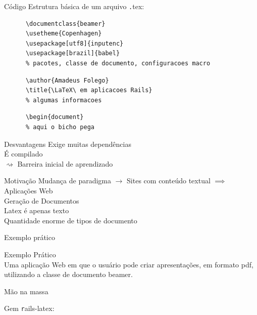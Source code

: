 \documentclass{beamer}
\begin{document}
  \begin{frame}[fragile]{Código}
    Estrutura básica de um arquivo {\texttt .tex}:
    \begin{verbatim}
      \documentclass{beamer}
      \usetheme{Copenhagen}
      \usepackage[utf8]{inputenc}
      \usepackage[brazil]{babel}
      % pacotes, classe de documento, configuracoes macro
    \end{verbatim}
    \pause\begin{verbatim}
      \author{Amadeus Folego}
      \title{\LaTeX\ em aplicacoes Rails}
      % algumas informacoes
    \end{verbatim}
    \pause\begin{verbatim}
      \begin{document}
      % aqui o bicho pega
    \end{verbatim}
\end{frame}
  \begin{frame}{Desvantagens}
     Exige muitas dependências\\\pause
    \onslide<2->{ $ \rightsquigarrow $ } É compilado\\\pause
     Barreira inicial de aprendizado
  \end{frame}
  \begin{frame}{Motivação} 
     Mudança de paradigma $\rightarrow$ {\tiny Sites com conteúdo textual $ \implies $ Aplicações Web}\\\pause
    \onslide<2>{$ \nabla $} Geração de Documentos\\\pause
     Latex é apenas texto\\\pause
     Quantidade enorme de tipos de documento\\
  \end{frame}
  \begin{frame}{Exemplo prático} 
    \begin{center} 
      {\Huge Exemplo Prático}\\[1em]
      Uma aplicação Web em que o usuário pode criar apresentações, em formato pdf, utilizando a classe de documento beamer.
    \end{center}
  \end{frame}
  \begin{frame}{Mão na massa} 
    \begin{center} 
      \Large Gem {\texttt rails-latex}: \href{https://github.com/jacott/rails-latex}{} 
    \end{center}
  \end{frame}
\end{document}
